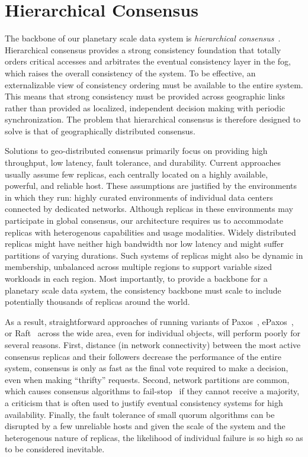 
\renewcommand{\thechapter}{3}

\chapter{Hierarchical Consensus}
\label{ch:hierarchical_consensus}

The backbone of our planetary scale data system is \emph{hierarchical consensus}~\cite{hc_brief_announcement}.
Hierarchical consensus provides a strong consistency foundation that totally orders critical accesses and arbitrates the eventual consistency layer in the fog, which raises the overall consistency of the system.
To be effective, an externalizable view of consistency ordering must be available to the entire system.
This means that strong consistency must be provided across geographic links rather than provided as localized, independent decision making with periodic synchronization.
The problem that hierarchical consensus is therefore designed to solve is that of geographically distributed consensus.

Solutions to geo-distributed consensus primarily focus on providing high throughput, low latency, fault tolerance, and durability.
Current approaches \cite{epaxos,mencius,calvindb,spaxos,sutra_fast_2011,peluso_making_2016} usually assume few replicas, each centrally located on a highly available, powerful, and reliable host.
These assumptions are justified by the environments in which they run: highly curated environments of individual data centers connected by dedicated networks.
Although replicas in these environments may participate in global consensus, our architecture requires us to accommodate replicas with heterogenous capabilities and usage modalities.
Widely distributed replicas might have neither high bandwidth nor low latency and might suffer partitions of varying durations.
Such systems of replicas might also be dynamic in membership, unbalanced across multiple regions to support variable sized workloads in each region.
Most importantly, to provide a backbone for a planetary scale data system, the consistency backbone must scale to include potentially thousands of replicas around the world.

As a result, straightforward approaches of running variants of Paxos~\cite{paxos,paxos_simple}, ePaxos~\cite{epaxos}, or Raft~\cite{raft} across the wide area, even for individual objects, will perform poorly for several reasons.
First, distance (in network connectivity) between the most active consensus replicas and their followers decrease the performance of the entire system, consensus is only as fast as the final vote required to make a decision, even when making ``thrifty'' requests.
Second, network partitions are common, which causes consensus algorithms to fail-stop~\cite{fail-stop} if they cannot receive a majority, a criticism that is often used to justify eventual consistency systems for high availability.
Finally, the fault tolerance of small quorum algorithms can be disrupted by a few unreliable hosts and given the scale of the system and the heterogenous nature of replicas, the likelihood of individual failure is so high so as to be considered inevitable.

